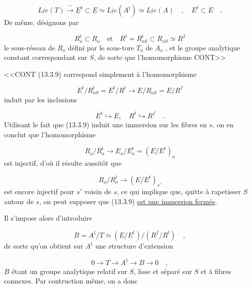 \begin{equation}\tag{13.3.10}
\underline{Lie}(T) \xrightarrow{\ \sim\ } \underline{E}^{t} \subset \underline{E} \simeq \underline{Lie}(A^{\natural}) \simeq \underline{Lie}(A) \quad , \quad E^{t} \subset E \quad .
\end{equation}
De même, désignons par

\begin{equation}\tag{13.3.11}
R_o^{t} \subset R_o \quad \mathrm{et} \quad R^{t} = R_{oS}^{t} \subset R_{oS} \simeq R^{f}
\end{equation}
le sous-réseau de $R_o$ défini par le sous-tore $T_o$ de $A_o$ , et le groupe analytique constant correspondant sur $S$, de sorte que l'homomorphisme CONT>>



<<CONT (13.3.9) correspond simplement à l'homomorphisme

\begin{equation*}
E^{t}/R_{oS}^{t} = E^{t}/R^{t} \longrightarrow E/R_{oS} = E/R^{f}
\end{equation*}
induit par les inclusions

\begin{equation*}
E^{t} \hookrightarrow E, \quad R^{t} \hookrightarrow R^{f} \quad .
\end{equation*}
Utilisant le fait que (13.3.9) induit une immersion sur les fibres en $s$, on en conclut que l'homomorphisme

\begin{equation*}
R_o/R_o^{t} \longrightarrow E_o/E_o^{t} = (E/E^{t})_o
\end{equation*}
est injectif, d'où il résulte aussitôt que

\begin{equation*}
R_o/R_o^{t} \longrightarrow (E/E^{t})_{s'}
\end{equation*}
est encore injectif pour $s'$ voisin de $s$, ce qui implique que, quitte à rapetisser $S$ autour de $s$, on peut supposer que (13.3.9) \underline{est une immersion fermée}.

Il s'impose alors d'introduire

\begin{equation}\tag{13.3.12}
B = A^{\natural}/T \simeq (E/E^{t})/(R^{f}/R^{t}) \quad ,
\end{equation}
de sorte qu'on obtient sur $A^{\natural}$ une structure d'extension

\begin{equation}\tag{13.3.13}
0 \longrightarrow T \longrightarrow A^{\natural} \longrightarrow B \longrightarrow 0 \quad ,
\end{equation}
$B$ étant un groupe analytique relatif sur $S$, lisse et séparé sur $S$ et à fibres connexes. Par contruction même, on a donc

